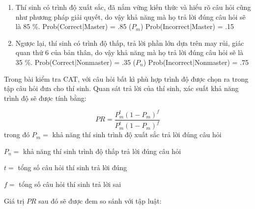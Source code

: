 \begin{enumerate}
	\item Thí sinh có trình độ xuất sắc, đã nắm vững kiến thức và hiểu rõ câu hỏi cũng như phương pháp giải quyết, do vậy khả năng mà họ trả lời đúng câu hỏi sẽ là 85 \%. 
		\subitem Prob(Correct|Master) = .85 ($P_m$)
		\subitem Prob(Incorrect|Master) = .15
	\item Ngược lại, thí sinh có trình độ thấp, trả lời phần lớn dựa trên may rủi, giác quan thứ 6 của bản thân, do vậy khả năng mà họ trả lời đúng câu hỏi sẽ là 35 \%. 
		\subitem Prob(Correct|Nonmaster) = .35 ($P_n$)
		\subitem Prob(Incorrect|Nonmaster) = .75
\end{enumerate}  

Trong bài kiểm tra CAT, với câu hỏi bất kì phù hợp trình độ được chọn ra trong tập câu hỏi đưa cho thí sinh. Quan sát trả lời của thí sinh, xác suất khả năng trình độ sẽ được tính bằng:

\begin{equation}
PR = \dfrac{P_m^t(1-P_m)^f}{P_m^t(1-P_m)^f}
\end{equation}
trong đó $P_m = $ khả năng thí sinh trình độ xuất sắc trả lời đúng câu hỏi

$P_n = $ khả năng thí sinh trình độ thấp trả lời đúng câu hỏi

$t = $ tổng số câu hỏi thí sinh trả lời đúng 

$f = $ tổng số câu hỏi thí sinh trả lời sai 

Giá trị $PR$ sau đó sẽ được đem so sánh với tập luật:

\begin{center}
\end{center}


